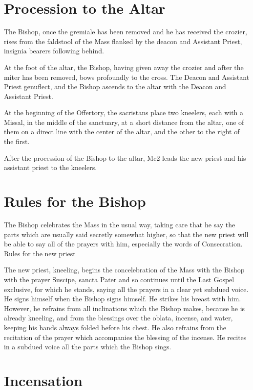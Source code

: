 \documentclass{report}
\begin{document}
{	\section{Procession to the Altar}

	The Bishop, once the gremiale has been removed and he has received the
	crozier, rises from the faldstool of the Mass flanked by the deacon and
	Assistant Priest, insignia bearers following behind.

	At the foot of the altar, the Bishop, having given away the crozier and
	after the miter has been removed, bows profoundly to the cross. The Deacon
	and Assistant Priest genuflect, and the Bishop ascends to the altar with
	the Deacon and Assistant Priest.

	At the beginning of the Offertory, the sacristans place two kneelers, each
	with a Missal, in the middle of the sanctuary, at a short distance from the
	altar, one of them on a direct line with the center of the altar, and the
	other to the right of the first.

	After the procession of the Bishop to the altar, Mc2 leads the new priest
	and his assistant priest to the kneelers.

	\section{Rules for the Bishop}

	The Bishop celebrates the Mass in the usual way, taking care that he say
	the parts which are usually said secretly somewhat higher, so that the new
	priest will be able to say all of the prayers with him, especially the
	words of Consecration. Rules for the new priest

	The new priest, kneeling, begins the concelebration of the Mass with the
	Bishop with the prayer Suscipe, sancta Pater and so continues until the
	Last Gospel exclusive, for which he stands, saying all the prayers in a
	clear yet subdued voice. He signs himself when the Bishop signs himself. He
	strikes his breast with him. However, he refrains from all inclinations
	which the Bishop makes, because he is already kneeling, and from the
	blessings over the oblata, incense, and water, keeping his hands always
	folded before his chest. He also refrains from the recitation of the prayer
	which accompanies the blessing of the incense. He recites in a subdued
	voice all the parts which the Bishop sings.

	\section{Incensation}

}
\end{document}
